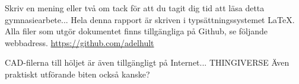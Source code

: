 Skriv en mening eller två om tack för att du tagit dig tid att läsa detta  gymnasiearbete...
Hela denna rapport är skriven i typsättningssystemet \LaTeX. Alla filer som utgör dokumentet finns tillgängliga på Github, se följande webbadress.
\url{https://github.com/adelhult}

CAD-filerna till höljet är även tillgängligt på Internet... THINGIVERSE
Även praktiskt utförande biten också kanske?